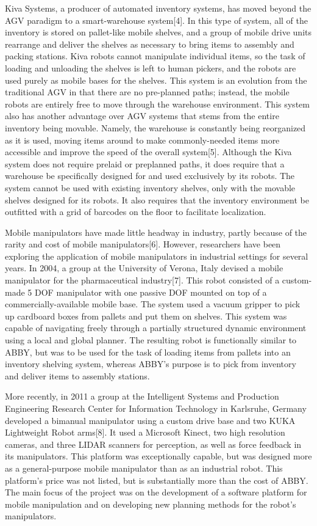 \documentclass[]{cwru} %
\begin{document}
Kiva Systems, a producer of automated inventory systems, has moved
beyond the AGV paradigm to a smart-warehouse system{[}4{]}. In this type
of system, all of the inventory is stored on pallet-like mobile shelves,
and a group of mobile drive units rearrange and deliver the shelves as
necessary to bring items to assembly and packing stations. Kiva robots
cannot manipulate individual items, so the task of loading and unloading
the shelves is left to human pickers, and the robots are used purely as
mobile bases for the shelves. This system is an evolution from the
traditional AGV in that there are no pre-planned paths; instead, the
mobile robots are entirely free to move through the warehouse
environment. This system also has another advantage over AGV systems
that stems from the entire inventory being movable. Namely, the
warehouse is constantly being reorganized as it is used, moving items
around to make commonly-needed items more accessible and improve the
speed of the overall system{[}5{]}. Although the Kiva system does not
require prelaid or preplanned paths, it does require that a warehouse be
specifically designed for and used exclusively by its robots. The system
cannot be used with existing inventory shelves, only with the movable
shelves designed for its robots. It also requires that the inventory
environment be outfitted with a grid of barcodes on the floor to
facilitate localization.

Mobile manipulators have made little headway in industry, partly because
of the rarity and cost of mobile manipulators{[}6{]}. However,
researchers have been exploring the application of mobile manipulators
in industrial settings for several years. In 2004, a group at the
University of Verona, Italy devised a mobile manipulator for the
pharmaceutical industry{[}7{]}. This robot consisted of a custom-made 5
DOF manipulator with one passive DOF mounted on top of a
commercially-available mobile base. The system used a vacuum gripper to
pick up cardboard boxes from pallets and put them on shelves. This
system was capable of navigating freely through a partially structured
dynamic environment using a local and global planner. The resulting
robot is functionally similar to ABBY, but was to be used for the task
of loading items from pallets into an inventory shelving system, whereas
ABBY's purpose is to pick from inventory and deliver items to assembly
stations.

More recently, in 2011 a group at the Intelligent Systems and Production
Engineering Research Center for Information Technology in Karlsruhe,
Germany developed a bimanual manipulator using a custom drive base and
two KUKA Lightweight Robot arms{[}8{]}. It used a Microsoft Kinect, two
high resolution cameras, and three LIDAR scanners for perception, as
well as force feedback in its manipulators. This platform was
exceptionally capable, but was designed more as a general-purpose mobile
manipulator than as an industrial robot. This platform's price was not
listed, but is substantially more than the cost of ABBY. The main focus
of the project was on the development of a software platform for mobile
manipulation and on developing new planning methods for the robot's
manipulators.
\end{document}
